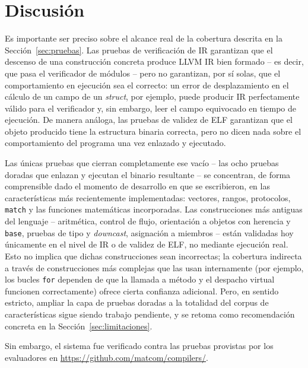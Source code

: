 \documentclass[12pt, a4paper]{article}
\begin{document}

\section{Discusión}
\label{sec:discusion}

Es importante ser preciso sobre el alcance real de la cobertura descrita en la
Sección~\ref{sec:pruebas}. Las pruebas de verificación de IR garantizan que el
descenso de una construcción concreta produce LLVM IR bien formado -- es
decir, que pasa el verificador de módulos -- pero no garantizan, por sí
solas, que el comportamiento en ejecución sea el correcto: un error de
desplazamiento en el cálculo de un campo de un \textit{struct}, por ejemplo,
puede producir IR perfectamente válido para el verificador y, sin embargo,
leer el campo equivocado en tiempo de ejecución. De manera análoga, las
pruebas de validez de ELF garantizan que el objeto producido tiene la
estructura binaria correcta, pero no dicen nada sobre el comportamiento del
programa una vez enlazado y ejecutado.

Las únicas pruebas que cierran completamente ese vacío -- las ocho pruebas
doradas que enlazan y ejecutan el binario resultante -- se concentran, de
forma comprensible dado el momento de desarrollo en que se escribieron, en las
características más recientemente implementadas: vectores, rangos,
protocolos, \texttt{match} y las funciones matemáticas incorporadas. Las
construcciones más antiguas del lenguaje -- aritmética, control de flujo,
orientación a objetos con herencia y \texttt{base}, pruebas de tipo y
\textit{downcast}, asignación a miembros -- están validadas hoy únicamente en
el nivel de IR o de validez de ELF, no mediante ejecución real. Esto no
implica que dichas construcciones sean incorrectas; la cobertura indirecta a
través de construcciones más complejas que las usan internamente (por
ejemplo, los bucles \texttt{for} dependen de
que la llamada a método y el despacho virtual funcionen correctamente) ofrece
cierta confianza adicional. Pero, en sentido estricto, ampliar la capa de
pruebas doradas a la totalidad del corpus de características sigue siendo
trabajo pendiente, y se retoma como recomendación concreta en la
Sección~\ref{sec:limitaciones}.

Sin embargo, el sistema fue verificado contra las pruebas provistas por los
evaluadores en \href{https://github.com/matcom/compilers}{https://github.com/matcom/compilers/}.
\end{document}
